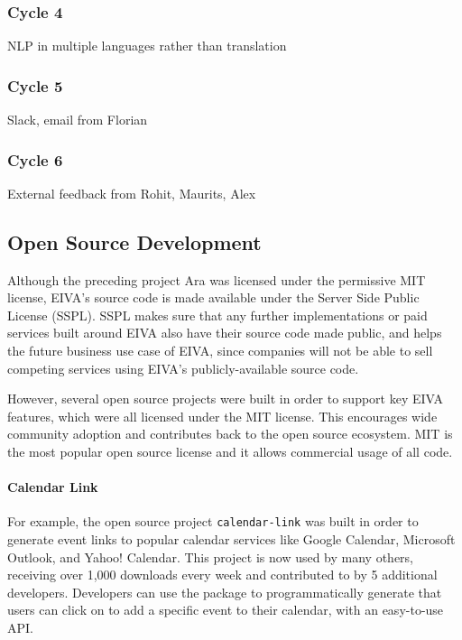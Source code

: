 \documentclass{article}
\begin{document}
\subsubsection{Cycle 4}

NLP in multiple languages rather than translation \thesubsubsection

\subsubsection{Cycle 5}

Slack, email from Florian

\subsubsection{Cycle 6}

External feedback from Rohit, Maurits, Alex

\subsection{Open Source Development}

Although the preceding project Ara was licensed under the permissive MIT license, EIVA's source code is made available under the Server Side Public License (SSPL). SSPL makes sure that any further implementations or paid services built around EIVA also have their source code made public, and helps the future business use case of EIVA, since companies will not be able to sell competing services using EIVA's publicly-available source code.

However, several open source projects were built in order to support key EIVA features, which were all licensed under the MIT license. This encourages wide community adoption and contributes back to the open source ecosystem. MIT is the most popular open source license and it allows commercial usage of all code.

\paragraph{Calendar Link}

For example, the open source project \texttt{calendar-link} was built in order to generate event links to popular calendar services like Google Calendar, Microsoft Outlook, and Yahoo! Calendar. This project is now used by many others, receiving over 1,000 downloads every week and contributed to by 5 additional developers. Developers can use the package to programmatically generate that users can click on to add a specific event to their calendar, with an easy-to-use API.
\end{document}

